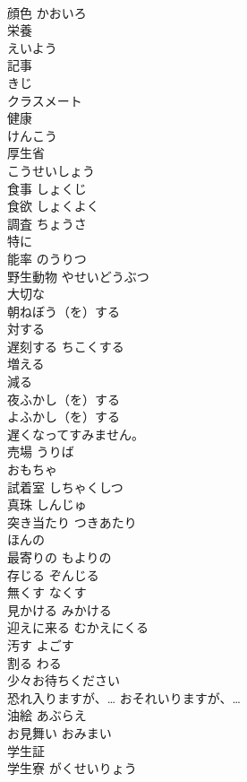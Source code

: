 \documentclass[8pt]{extreport}
\begin{document}
\begin{CJK}{UTF8}{min}
\\	顔色	かおいろ	
\\	栄養
\\	えいよう	
\\	記事
\\	きじ	
\\	クラスメート		
\\	健康
\\	けんこう	
\\	厚生省
\\	こうせいしょう	
\\	食事	しょくじ	
\\	食欲	しょくよく	
\\	調査	ちょうさ	
\\	特に		
\\	能率	のうりつ	
\\	野生動物	やせいどうぶつ	
\\	大切な		
\\	朝ねぼう（を）する		
\\	対する		
\\	遅刻する	ちこくする	
\\	増える		
\\	減る		
\\	夜ふかし（を）する
\\	よふかし（を）する	
\\	遅くなってすみません。		
\\	売場	うりば	
\\	おもちゃ		
\\	試着室	しちゃくしつ	
\\	真珠	しんじゅ	
\\	突き当たり	つきあたり	
\\	ほんの		
\\	最寄りの	もよりの	
\\	存じる	ぞんじる	
\\	無くす	なくす	
\\	見かける	みかける	
\\	迎えに来る	むかえにくる	
\\	汚す	よごす	
\\	割る	わる	
\\	少々お待ちください		
\\	恐れ入りますが、…	おそれいりますが、…	
\\	油絵	あぶらえ	
\\	お見舞い	おみまい	
\\	学生証		
\\	学生寮	がくせいりょう	

\end{CJK}
\end{document}
